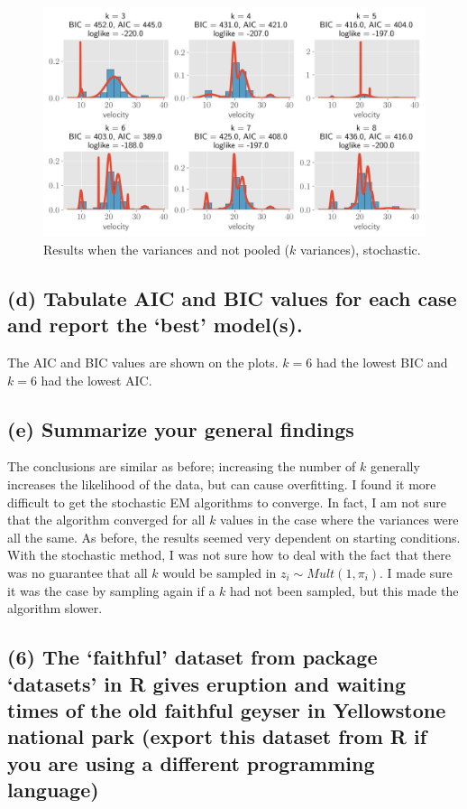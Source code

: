\documentclass[11pt]{article}
\begin{document}
\begin{figure}[!h]
    \centering
    \includegraphics[scale=.6
    ]{homework_4/figures/galaxies_4.png}
    \caption{Results when the variances and not pooled ($k$ variances), stochastic.}
    \label{fig:my_label}
\end{figure}
\newpage
\subsection*{(d) Tabulate AIC and BIC values for each case and report the ‘best’ model(s).}

The AIC and BIC values are shown on the plots. $k=6$ had the lowest BIC and $k=6$ had the lowest AIC.

\subsection*{(e) Summarize your general findings}
The conclusions are similar as before; increasing the number of $k$ generally increases the likelihood of the data, but can cause overfitting.  I found it more difficult to get the stochastic EM algorithms to converge. In fact, I am not sure that the algorithm converged for all $k$ values in the case where the variances were all the same. As before, the results seemed very dependent on starting conditions. With the stochastic method, I was not sure how to deal with the fact that there was no guarantee that all $k$ would be sampled in $z_i \sim Mult(1, \pi_i)$. I made sure it was the case by sampling again if a $k$ had not been sampled, but this made the algorithm slower.




\subsection*{(6) The ‘faithful’ dataset from package ‘datasets’ in R gives eruption and waiting times of the old faithful geyser in Yellowstone national park (export this dataset from R if you are using a different programming language)}
\end{document}
